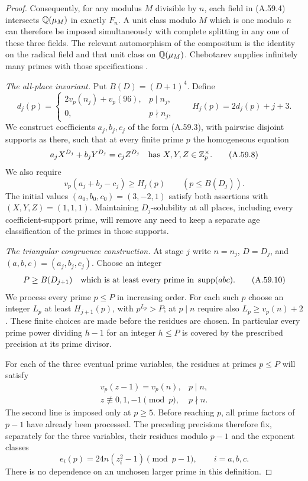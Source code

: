 \begin{proof}
Consequently, for any modulus $M$ divisible by $n$,
each field in (A.59.4) intersects $\mathbb Q(\mu_M)$ in
exactly $F_n$. A unit class modulo $M$ which is one
modulo $n$ can therefore be imposed simultaneously
with complete splitting in any one of these three
fields. The relevant automorphism of the compositum
is the identity on the radical field and that unit
class on $\mathbb Q(\mu_M)$. Chebotarev supplies infinitely
many primes with those specifications
\cite[Theorem 8.31]{AgentMilneANT}.



\emph{The all-place invariant.}
Put $B(D)=(D+1)^4$. Define
\[
 d_j(p)=
 \begin{cases}
  2v_p(n_j)+v_p(96),&p\mid n_j,\\
  0,&p\nmid n_j,
 \end{cases}
 \qquad H_j(p)=2d_j(p)+j+3.
 \tag{A.59.7}
\]
We construct coefficients $a_j,b_j,c_j$ of the form
(A.59.3), with pairwise disjoint supports as there,
such that at every finite prime $p$ the homogeneous
equation
\[
       a_jX^{D_j}+b_jY^{D_j}=c_jZ^{D_j}
           \quad\hbox{has }X,Y,Z\in\mathbb Z_p^\times.
 \tag{A.59.8}
\]
We also require
\[
 v_p(a_j+b_j-c_j)\ge H_j(p)
                       \qquad(p\le B(D_j)).
 \tag{A.59.9}
\]
The initial values $(a_0,b_0,c_0)=(3,-2,1)$
satisfy both assertions with $(X,Y,Z)=(1,1,1)$.
Maintaining $D_j$-solubility at all places, including
every coefficient-support prime, will remove any
need to keep a separate age classification of
the primes in those supports.

\emph{The triangular congruence construction.}
At stage $j$ write $n=n_j$, $D=D_j$, and
$(a,b,c)=(a_j,b_j,c_j)$. Choose an integer
\[
 P\ge B(D_{j+1})
       \quad\hbox{which is at least every prime in }
                      \operatorname{supp}(abc).
 \tag{A.59.10}
\]
We process every prime $p\le P$ in increasing order.
For each such $p$ choose an integer $L_p$ at least
$H_{j+1}(p)$, with $p^{L_p}>P$; at $p\mid n$
require also $L_p\ge v_p(n)+2$.
These finite choices are made before the residues
are chosen. In particular every prime power
dividing $h-1$ for an integer $h\le P$ is covered
by the prescribed precision at its prime divisor.

For each of the three eventual prime variables,
the residues at primes $p\le P$ will satisfy
\[
 \begin{array}{ll}
 v_p(z-1)=v_p(n),&p\mid n,\\
 z\not\equiv0,1,-1\pmod p,&p\nmid n.
 \end{array}
 \tag{A.59.11}
\]
The second line is imposed only at $p\ge5$.
Before reaching $p$, all prime factors of $p-1$
have already been processed. The preceding
precisions therefore fix, separately for the
three variables, their residues modulo $p-1$
and the exponent classes
\[
             e_i(p)=24n(z_i^2-1)\pmod{p-1},
                         \qquad i=a,b,c.
 \tag{A.59.12}
\]
There is no dependence on an unchosen larger
prime in this definition.


\end{proof}
